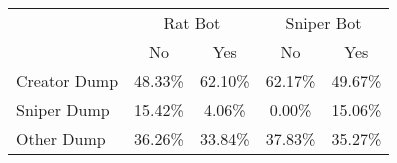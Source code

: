 \begin{tabular}{lcccc}
\toprule
& \multicolumn{2}{c}{Rat Bot} & \multicolumn{2}{c}{Sniper Bot} \\
\cmidrule(lr){2-3} \cmidrule(lr){4-5}
& No & Yes & No & Yes \\
\midrule
Creator Dump & 48.33\% & 62.10\% & 62.17\% & 49.67\% \\
Sniper Dump & 15.42\% & 4.06\% & 0.00\% & 15.06\% \\
Other Dump & 36.26\% & 33.84\% & 37.83\% & 35.27\% \\
\bottomrule
\end{tabular}